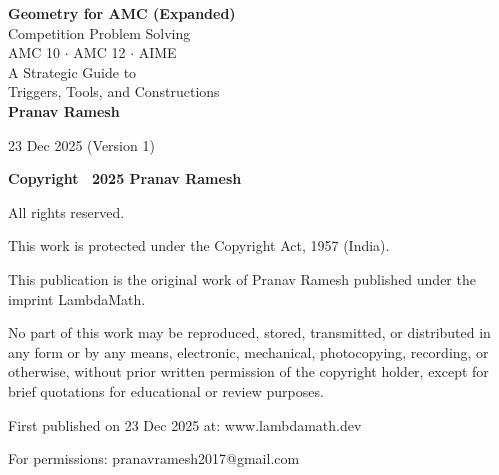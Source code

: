 ﻿\documentclass[12pt]{extarticle}
\begin{document}
\begin{titlepage}
\centering
\vspace*{2cm}

{\Huge\bfseries Geometry for AMC (Expanded)}\\[0.5cm]
{\Large Competition Problem Solving}\\[2cm]

{\large AMC 10 $\cdot$ AMC 12 $\cdot$ AIME}\\[3cm]

{\Large A Strategic Guide to\\[0.3cm]
Triggers, Tools, and Constructions}\\[3cm]

{\Large\textbf{Pranav Ramesh}}\\[3cm]

\vfill

{\large 23 Dec 2025 (Version 1)}
\end{titlepage}

\thispagestyle{empty}
\vspace*{\fill}
\begin{center}
\textbf{\Large Copyright \textcopyright\ 2025 Pranav Ramesh}

All rights reserved.

This work is protected under the Copyright Act, 1957 (India).

\vspace{1.5cm}

This publication is the original work of Pranav Ramesh published under the imprint LambdaMath.

\vspace{1.5cm}

No part of this work may be reproduced, stored, transmitted, or distributed in any form or by any means, electronic, mechanical, photocopying, recording, or otherwise, without prior written permission of the copyright holder, except for brief quotations for educational or review purposes.

\vspace{1.5cm}

First published on 23 Dec 2025 at: www{.}lambdamath{.}dev

For permissions: pranavramesh2017@gmail{.}com
\end{center}
\vspace*{\fill}

\newpage
\end{document}
